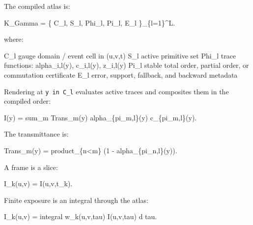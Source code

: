 \documentclass[
]{article}
\newenvironment{Shaded}{}{}
\newcommand{\NormalTok}[1]{#1}
\begin{document}
The compiled atlas is:

\begin{Shaded}
\begin{Highlighting}[]
\NormalTok{K\_Gamma = \{ C\_l, S\_l, Phi\_l, Pi\_l, E\_l \}\_\{l=1\}\^{}L.}
\end{Highlighting}
\end{Shaded}

where:

\begin{Shaded}
\begin{Highlighting}[]
\NormalTok{C\_l       gauge domain / event cell in (u,v,t)}
\NormalTok{S\_l       active primitive set}
\NormalTok{Phi\_l     trace functions: alpha\_i,l(y), c\_i,l(y), z\_i,l(y)}
\NormalTok{Pi\_l      stable total order, partial order, or commutation certificate}
\NormalTok{E\_l       error, support, fallback, and backward metadata}
\end{Highlighting}
\end{Shaded}

Rendering at \texttt{y\ in\ C\_l} evaluates active traces and composites
them in the compiled order:

\begin{Shaded}
\begin{Highlighting}[]
\NormalTok{I(y) = sum\_m Trans\_m(y) alpha\_\{pi\_m,l\}(y) c\_\{pi\_m,l\}(y).}
\end{Highlighting}
\end{Shaded}

The transmittance is:

\begin{Shaded}
\begin{Highlighting}[]
\NormalTok{Trans\_m(y) = product\_\{n\textless{}m\} (1 {-} alpha\_\{pi\_n,l\}(y)).}
\end{Highlighting}
\end{Shaded}

A frame is a slice:

\begin{Shaded}
\begin{Highlighting}[]
\NormalTok{I\_k(u,v) = I(u,v,t\_k).}
\end{Highlighting}
\end{Shaded}

Finite exposure is an integral through the atlas:

\begin{Shaded}
\begin{Highlighting}[]
\NormalTok{I\_k(u,v) = integral w\_k(u,v,tau) I(u,v,tau) d tau.}
\end{Highlighting}
\end{Shaded}
\end{document}

